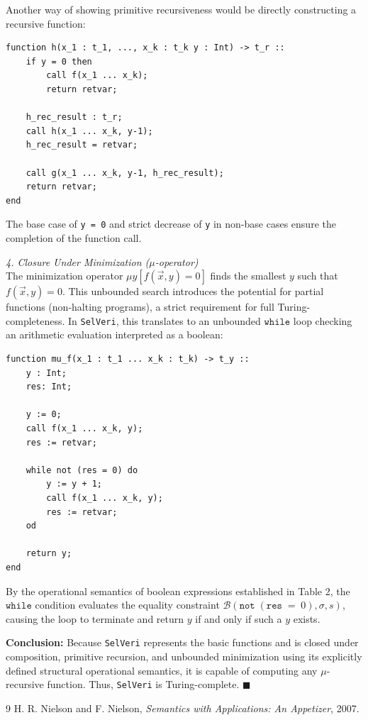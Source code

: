 \documentclass{article}
\begin{document}
Another way of showing primitive recursiveness would be directly constructing a recursive function:

\begin{verbatim}
function h(x_1 : t_1, ..., x_k : t_k y : Int) -> t_r ::
    if y = 0 then
        call f(x_1 ... x_k);
        return retvar;

    h_rec_result : t_r;
    call h(x_1 ... x_k, y-1);
    h_rec_result = retvar;
    
    call g(x_1 ... x_k, y-1, h_rec_result);
    return retvar;
end
\end{verbatim}

The base case of \texttt{y = 0} and strict decrease of \texttt{y} in non-base cases ensure the completion of the function call.


\textit{4. Closure Under Minimization ($\mu$-operator)} \\
The minimization operator $\mu y [f(\vec{x}, y) = 0]$ finds the smallest $y$ such that $f(\vec{x}, y) = 0$. This unbounded search introduces the potential for partial functions (non-halting programs), a strict requirement for full Turing-completeness. In \texttt{SelVeri}, this translates to an unbounded $\mathtt{while}$ loop checking an arithmetic evaluation interpreted as a boolean:
\begin{verbatim}
function mu_f(x_1 : t_1 ... x_k : t_k) -> t_y ::
    y : Int;
    res: Int;
    
    y := 0;
    call f(x_1 ... x_k, y);
    res := retvar;
    
    while not (res = 0) do
        y := y + 1;
        call f(x_1 ... x_k, y);
        res := retvar;
    od
    
    return y;
end
\end{verbatim}
By the operational semantics of boolean expressions established in Table 2, the $\mathtt{while}$ condition evaluates the equality constraint $\mathcal{B}(\mathtt{not}\; (\mathtt{res} \;\mathtt{=}\; 0), \sigma, s)$, causing the loop to terminate and return $y$ if and only if such a $y$ exists.

\textbf{Conclusion:} Because \texttt{SelVeri} represents the basic functions and is closed under composition, primitive recursion, and unbounded minimization using its explicitly defined structural operational semantics, it is capable of computing any $\mu$-recursive function. Thus, \texttt{SelVeri} is Turing-complete. $\blacksquare$

\newpage
\begin{thebibliography}{9}
 H. R. Nielson and F. Nielson, \emph{Semantics with Applications: An Appetizer}, 2007.
\end{thebibliography}
\end{document}
